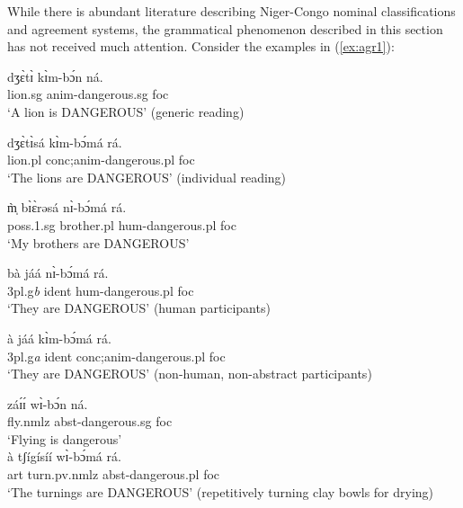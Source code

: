 \begin{exe}
\begin{exe}
\begin{exe}
{\begin{exe}
\begin{exe}
\begin{exe}
\begin{exe}
\begin{exe}
\begin{exe}
\begin{exe}
\begin{exe}
\begin{exe}
\begin{exe}
\begin{exe}
\begin{exe}
\begin{exe}
\begin{exe}
\begin{exe}
\begin{exe}
\begin{exe}
\begin{exe}
\begin{exe}
 While there is abundant  literature describing Niger-Congo nominal
classifications and
agreement systems, the grammatical phenomenon  described in
this section  has not received much attention.  Consider the examples in
(\ref{ex:agr1}):   


\ea\label{ex:agr1}



\ea\label{ex:agrA}
\gll  dʒɛ̀tɪ̀ kɪ̀m-bɔ́n  ná.\\
  lion.{\sc sg}  {\sc anim}-dangerous.{\sc sg}  {\sc foc}\\
\glt  `A lion is DANGEROUS' (generic reading) 



\ex\label{ex:agrB}
\gll dʒɛ̀tɪ̀sá kɪ̀m-bɔ́má  rá.\\
  lion.{\sc pl}  {\sc  conc;anim}-dangerous.{\sc pl} {\sc foc}\\
\glt  `The lions are DANGEROUS' (individual reading) 



\ex\label{ex:agrD}
\gll   m̩̀ bɪ̀ɛ̀rəsá  nɪ̀-bɔ́má  rá.\\
{\sc poss.1.sg} {brother.{\sc pl}}  {\sc hum}-dangerous.{\sc pl} {\sc foc}\\
\glt  `My brothers are DANGEROUS'


\ex\label{ex:agrE}
\gll bà  jáá  nɪ̀-bɔ́má   rá.\\
{{\sc  3pl.g}{\it b}} {\sc ident} {\sc hum}-{dangerous.{\sc pl}} {\sc foc}\\
\glt  `They are DANGEROUS' (human participants) 



\ex\label{ex:agrF}
\gll   à   jáá   kɪ̀m-bɔ́má  rá.\\
{{\sc  3pl.g}{\it a}} {\sc ident}  {\sc  conc;anim}-{dangerous.{\sc pl}}
{\sc foc}\\
\glt  `They are DANGEROUS' (non-human, non-abstract participants) 



\ex\label{ex:agrG}
\gll záɪ́ɪ́   wɪ̀-bɔ́n ná.\\
 fly.{\sc nmlz} {\sc abst}-dangerous.{\sc sg}  {\sc foc}\\
\glt  `Flying is dangerous'\\




\ex\label{ex:agrH}
\gll à tʃígísíí wɪ̀-bɔ́má rá.\\
{\sc art}  turn.{\sc pv.nmlz}  {\sc abst}-dangerous.{\sc pl}  {\sc 
foc}
\\
\glt  `The turnings  are DANGEROUS' (repetitively turning clay bowls for
drying)\\



\end{exe}
\end{exe}
\end{exe}
\end{exe}
\end{exe}
\end{exe}
\end{exe}
\end{exe}
\end{exe}
\end{exe}
\end{exe}
\end{exe}
\end{exe}
\end{exe}
\end{exe}
\end{exe}
\end{exe}
\end{exe}
\end{exe}}
\end{exe}
\end{exe}
\end{exe}
